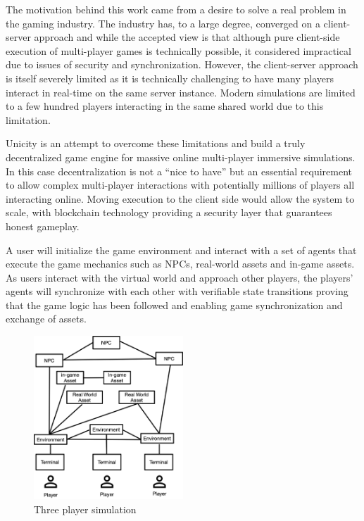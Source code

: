 \documentclass{article}
\begin{document}
The motivation behind this work came from a desire to solve a real problem in the gaming industry. The industry has, to a large degree, converged on a client-server approach and while the accepted view is that although pure client-side execution of multi-player games is technically possible, it considered impractical due to issues of security and synchronization. However, the client-server approach is itself severely limited as it is technically challenging to have many players interact in real-time on the same server instance. Modern simulations are limited to a few hundred players interacting in the same shared world due to this limitation.


Unicity is an attempt to overcome these limitations and build a truly decentralized game engine for massive online multi-player immersive simulations. In this case decentralization is not a “nice to have” but an essential requirement to allow complex multi-player interactions with potentially millions of players all interacting online. Moving execution to the client side would allow the system to scale, with blockchain technology providing a security layer that guarantees honest gameplay.


A user will initialize the game environment and interact with a set of agents that execute the game mechanics such as NPCs, real-world assets and in-game assets. As users interact with the virtual world and approach other players, the players' agents will synchronize with each other with verifiable state transitions proving that the game logic has been followed and enabling game synchronization and exchange of assets.

\begin{figure}[H]
    \centering
    \includegraphics[width=0.5\textwidth]{game.png}
    \caption{Three player simulation}
    \label{fig:game}
\end{figure}
\end{document}
